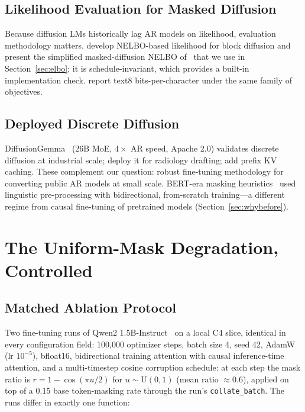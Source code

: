 \documentclass{article}
\begin{document}
\subsection{Likelihood Evaluation for Masked Diffusion}

Because diffusion LMs historically lag AR models on likelihood, evaluation methodology
matters. \cite{arriola2025blockdiffusion} develop NELBO-based likelihood for block
diffusion and present the simplified masked-diffusion NELBO of~\cite{sahoo2024mdlm}
that we use in Section~\ref{sec:elbo}; it is schedule-invariant, which provides a
built-in implementation check. \cite{shing2026diffusionblocks} report text8
bits-per-character under the same family of objectives.

\subsection{Deployed Discrete Diffusion}

DiffusionGemma~\cite{diffusiongemma2026} (26B MoE, $4\times$ AR speed, Apache 2.0)
validates discrete diffusion at industrial scale; \cite{gevaert2026radiology} deploy it
for radiology drafting; \cite{go2026bicache} add prefix KV caching. These complement
our question: robust fine-tuning methodology for converting public AR models at small
scale. BERT-era masking heuristics~\cite{devlin2019bert,raffel2020t5,joshi2020spanbert}
used linguistic pre-processing with bidirectional, from-scratch training---a different
regime from causal fine-tuning of pretrained models (Section~\ref{sec:whybefore}).


\section{The Uniform-Mask Degradation, Controlled}
\label{sec:failure}

\subsection{Matched Ablation Protocol}
\label{sec:protocol}

Two fine-tuning runs of Qwen2 1.5B-Instruct~\cite{yang2024qwen2} on a local C4
slice, identical in every configuration field:
100{,}000 optimizer steps, batch size 4, seed 42, AdamW (lr $10^{-5}$), bfloat16,
bidirectional training attention with causal inference-time attention, and a
multi-timestep cosine corruption schedule: at each step the mask ratio is
$r = 1 - \cos(\pi u / 2)$ for $u \sim \mathrm{U}(0,1)$ (mean ratio $\approx 0.6$),
applied on top of a 0.15 base token-masking rate through the run's
\texttt{collate\_batch}. The runs differ in exactly one function:
\end{document}
